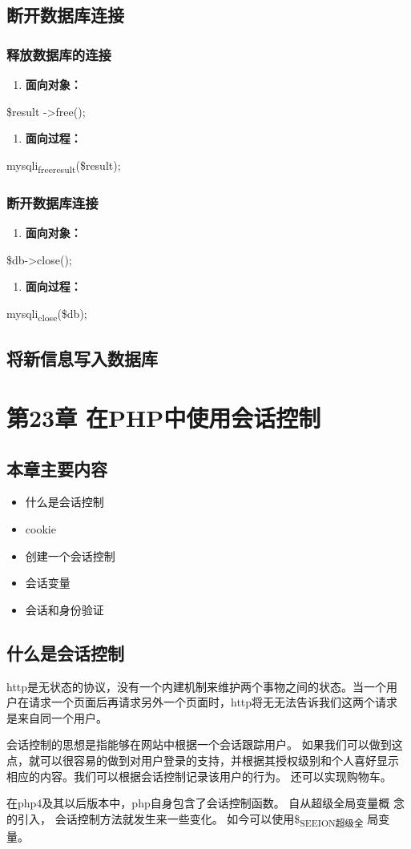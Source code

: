 \documentclass[11pt]{article}
\begin{document}
\subsection{断开数据库连接}
\label{sec:org410073b}
\subsubsection{释放数据库的连接}
\label{sec:org962eb20}
\begin{enumerate}
\item \textbf{面向对象：}
\end{enumerate}
\$result ->free();
\begin{enumerate}
\item \textbf{面向过程：}
\end{enumerate}
mysqli\textsubscript{free}\textsubscript{result}(\$result);
\subsubsection{断开数据库连接}
\label{sec:orga968c24}
\begin{enumerate}
\item \textbf{面向对象：}
\end{enumerate}
\$db->close();
\begin{enumerate}
\item \textbf{面向过程：}
\end{enumerate}
mysqli\textsubscript{close}(\$db);
\subsection{将新信息写入数据库}
\label{sec:orgc4b4c16}
\section{第23章 在PHP中使用会话控制}
\label{sec:org65ed678}
\subsection{本章主要内容}
\label{sec:org458061a}
\begin{itemize}
\item 什么是会话控制
\item cookie
\item 创建一个会话控制
\item 会话变量
\item 会话和身份验证
\end{itemize}
\subsection{什么是会话控制}
\label{sec:orgcb08d55}
http是无状态的协议，没有一个内建机制来维护两个事物之间的状态。当一个用
户在请求一个页面后再请求另外一个页面时，http将无无法告诉我们这两个请求
是来自同一个用户。

会话控制的思想是指能够在网站中根据一个会话跟踪用户。  如果我们可以做到这
点，就可以很容易的做到对用户登录的支持，并根据其授权级别和个人喜好显示
相应的内容。我们可以根据会话控制记录该用户的行为。  还可以实现购物车。

在php4及其以后版本中，php自身包含了会话控制函数。  自从超级全局变量概
念的引入， 会话控制方法就发生来一些变化。  如今可以使用\$\textsubscript{SEEION超级全}
局变量。
\end{document}
